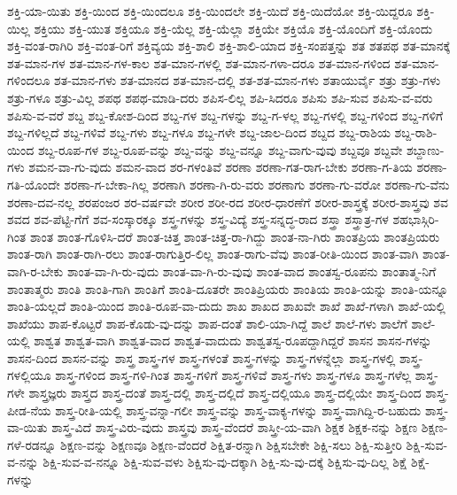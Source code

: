 {ಶಕ್ತಿ-ಯಾ-ಯಿತು
ಶಕ್ತಿ-ಯಿಂದ
ಶಕ್ತಿ-ಯಿಂದಲೂ
ಶಕ್ತಿ-ಯಿಂದಲೇ
ಶಕ್ತಿ-ಯಿದೆ
ಶಕ್ತಿ-ಯಿದೆಯೋ
ಶಕ್ತಿ-ಯಿದ್ದರೂ
ಶಕ್ತಿ-ಯಿಲ್ಲ
ಶಕ್ತಿಯು
ಶಕ್ತಿ-ಯುತ
ಶಕ್ತಿಯೂ
ಶಕ್ತಿ-ಯೆಲ್ಲ
ಶಕ್ತಿ-ಯೆಲ್ಲಾ
ಶಕ್ತಿಯೇ
ಶಕ್ತಿಯೊ
ಶಕ್ತಿ-ಯೊಂದಿಗೆ
ಶಕ್ತಿ-ಯೊಂದು
ಶಕ್ತಿ-ವಂತ-ರಾಗಿರಿ
ಶಕ್ತಿ-ವಂತ-ರಿಗೆ
ಶಕ್ತಿವ್ಯಯ
ಶಕ್ತಿ-ಶಾಲಿ
ಶಕ್ತಿ-ಶಾಲಿ-ಯಾದ
ಶಕ್ತಿ-ಸಂಪತ್ತನ್ನು
ಶತ
ಶತಪಥ
ಶತ-ಮಾನಕ್ಕೆ
ಶತ-ಮಾನ-ಗಳ
ಶತ-ಮಾನ-ಗಳ-ಕಾಲ
ಶತ-ಮಾನ-ಗಳಲ್ಲಿ
ಶತ-ಮಾನ-ಗಳಾ-ದರೂ
ಶತ-ಮಾನ-ಗಳಿಂದ
ಶತ-ಮಾನ-ಗಳಿಂದಲೂ
ಶತ-ಮಾನ-ಗಳು
ಶತ-ಮಾನದ
ಶತ-ಮಾನ-ದಲ್ಲಿ
ಶತ-ಶತ-ಮಾನ-ಗಳು
ಶತಾಯುರ್ವೈ
ಶತ್ರು
ಶತ್ರು-ಗಳು
ಶತ್ರು-ಗಳೂ
ಶತ್ರು-ವಿಲ್ಲ
ಶಪಥ
ಶಪಥ-ಮಾಡಿ-ದರು
ಶಪಿಸ-ಲಿಲ್ಲ
ಶಪಿ-ಸಿದರೂ
ಶಪಿಸು
ಶಪಿ-ಸುವ
ಶಪಿಸು-ವ-ವರು
ಶಪಿಸು-ವ-ವರೆ
ಶಬ್ದ
ಶಬ್ದ-ಕೋಶ-ದಿಂದ
ಶಬ್ದ-ಗಳ
ಶಬ್ದ-ಗಳನ್ನು
ಶಬ್ದ-ಗ-ಳಲ್ಲ
ಶಬ್ದ-ಗಳಲ್ಲಿ
ಶಬ್ದ-ಗಳಿಂದ
ಶಬ್ದ-ಗಳಿಗೆ
ಶಬ್ದ-ಗಳಿಲ್ಲದೆ
ಶಬ್ದ-ಗಳಿವೆ
ಶಬ್ದ-ಗಳು
ಶಬ್ದ-ಗಳೂ
ಶಬ್ದ-ಗಳೇ
ಶಬ್ದ-ಜಾಲ-ದಿಂದ
ಶಬ್ದದ
ಶಬ್ದ-ರಾಶಿಯ
ಶಬ್ದ-ರಾಶಿ-ಯಿಂದ
ಶಬ್ದ-ರೂಪ-ಗಳ
ಶಬ್ದ-ರೂಪ-ವನ್ನು
ಶಬ್ದ-ವನ್ನು
ಶಬ್ದ-ವನ್ನೂ
ಶಬ್ದ-ವಾಗು-ವುವು
ಶಬ್ದವೂ
ಶಬ್ದವೇ
ಶಬ್ದಾಣು-ಗಳು
ಶಮನ-ವಾ-ಗು-ವುದು
ಶಮನ-ವಾದ
ಶರ-ಗಳಂತಿವೆ
ಶರಣಾ
ಶರಣಾ-ಗತ-ರಾಗ-ಬೇಕು
ಶರಣಾ-ಗ-ತಿಯ
ಶರಣಾ-ಗತಿ-ಯೊಂದೇ
ಶರಣಾ-ಗ-ಬೇಕಾ-ಗಿಲ್ಲ
ಶರಣಾಗಿ
ಶರಣಾ-ಗಿ-ರು-ವರು
ಶರಣಾಗು
ಶರಣಾ-ಗು-ವರೋ
ಶರಣಾ-ಗು-ವೆನು
ಶರಣಾ-ದವ-ನಲ್ಲ
ಶರಪಂಜರ
ಶರ-ವರ್ಷವೇ
ಶರೀರ
ಶರೀ-ರದ
ಶರೀರ-ಧಾರಣೆಗೆ
ಶರೀರ-ಶಾಸ್ತ್ರಕ್ಕೆ
ಶರೀರ-ಶಾಸ್ತ್ರವು
ಶವ
ಶವದ
ಶವ-ಪೆಟ್ಟಿ-ಗೆಗೆ
ಶವ-ಸಂಸ್ಕಾರಕ್ಕೂ
ಶಸ್ತ್ರ-ಗಳನ್ನು
ಶಸ್ತ್ರ-ವಿದ್ಯೆ
ಶಸ್ತ್ರ-ಸನ್ನದ್ಧ-ರಾದ
ಶಸ್ತ್ರಾ
ಶಸ್ತ್ರಾತ್ರ-ಗಳ
ಶಹಭಾಸ್ಗಿರಿ-ಗಿಂತ
ಶಾಂತ
ಶಾಂತ-ಗೊಳಿಸಿ-ದರೆ
ಶಾಂತ-ಚಿತ್ತ
ಶಾಂತ-ಚಿತ್ತ-ರಾ-ಗಿದ್ದು
ಶಾಂತ-ನಾ-ಗಿರು
ಶಾಂತಪ್ರಿಯ
ಶಾಂತಪ್ರಿಯರು
ಶಾಂತ-ರಾಗಿ
ಶಾಂತ-ರಾಗಿ-ರಲು
ಶಾಂತ-ರಾಗುತ್ತಿರ-ಲಿಲ್ಲ
ಶಾಂತ-ರಾಗು-ವೆವು
ಶಾಂತ-ರೀತಿ-ಯಿಂದ
ಶಾಂತ-ವಾಗಿ
ಶಾಂತ-ವಾಗಿ-ರ-ಬೇಕು
ಶಾಂತ-ವಾ-ಗಿ-ರು-ವುದು
ಶಾಂತ-ವಾ-ಗಿ-ರು-ವುವು
ಶಾಂತ-ವಾದ
ಶಾಂತಸ್ವ-ರೂಪನು
ಶಾಂತಾತ್ಮ-ನಿಗೆ
ಶಾಂತಾತ್ಮರು
ಶಾಂತಿ
ಶಾಂತಿ-ಗಾಗಿ
ಶಾಂತಿಗೆ
ಶಾಂತಿ-ದೂತರೇ
ಶಾಂತಿಪ್ರಿಯರು
ಶಾಂತಿಯ
ಶಾಂತಿ-ಯನ್ನು
ಶಾಂತಿ-ಯನ್ನೂ
ಶಾಂತಿ-ಯಲ್ಲದೆ
ಶಾಂತಿ-ಯಿಂದ
ಶಾಂತಿ-ರೂಪ-ವಾ-ದುದು
ಶಾಖ
ಶಾಖದ
ಶಾಖವೇ
ಶಾಖೆ
ಶಾಖೆ-ಗಳಾಗಿ
ಶಾಖೆ-ಯಲ್ಲಿ
ಶಾಖೆಯು
ಶಾಪ-ಕೊಟ್ಟರೆ
ಶಾಪ-ಕೊಡು-ವು-ದನ್ನು
ಶಾಪ-ದಂತೆ
ಶಾಲಿ-ಯಾ-ಗಿದ್ದೆ
ಶಾಲೆ
ಶಾಲೆ-ಗಳು
ಶಾಲೆಗೆ
ಶಾಲೆ-ಯಲ್ಲಿ
ಶಾಶ್ವತ
ಶಾಶ್ವತ-ವಾಗಿ
ಶಾಶ್ವತ-ವಾದ
ಶಾಶ್ವತ-ವಾದುದು
ಶಾಶ್ವತಸ್ವ-ರೂಪದ್ದಾಗಿದ್ದರೆ
ಶಾಸನ
ಶಾಸನ-ಗಳನ್ನು
ಶಾಸನ-ದಿಂದ
ಶಾಸನ-ವನ್ನು
ಶಾಸ್ತ್ರ
ಶಾಸ್ತ್ರ-ಗಳ
ಶಾಸ್ತ್ರ-ಗಳಂತೆ
ಶಾಸ್ತ್ರ-ಗಳನ್ನು
ಶಾಸ್ತ್ರ-ಗಳನ್ನೆಲ್ಲಾ
ಶಾಸ್ತ್ರ-ಗಳಲ್ಲಿ
ಶಾಸ್ತ್ರ-ಗಳಲ್ಲಿಯೂ
ಶಾಸ್ತ್ರ-ಗಳಿಂದ
ಶಾಸ್ತ್ರ-ಗಳಿ-ಗಿಂತ
ಶಾಸ್ತ್ರ-ಗಳಿಗೆ
ಶಾಸ್ತ್ರ-ಗಳಿವೆ
ಶಾಸ್ತ್ರ-ಗಳು
ಶಾಸ್ತ್ರ-ಗಳೂ
ಶಾಸ್ತ್ರ-ಗಳೆಲ್ಲ
ಶಾಸ್ತ್ರ-ಗಳೇ
ಶಾಸ್ತ್ರಜ್ಞರು
ಶಾಸ್ತ್ರದ
ಶಾಸ್ತ್ರ-ದಂತೆ
ಶಾಸ್ತ್ರ-ದಲ್ಲಿ
ಶಾಸ್ತ್ರ-ದಲ್ಲಿದೆ
ಶಾಸ್ತ್ರ-ದಲ್ಲಿಯೂ
ಶಾಸ್ತ್ರ-ದಲ್ಲಿಯೇ
ಶಾಸ್ತ್ರ-ದಿಂದ
ಶಾಸ್ತ್ರ-ಪೀಡ-ನೆಯ
ಶಾಸ್ತ್ರ-ರೀತಿ-ಯಲ್ಲಿ
ಶಾಸ್ತ್ರ-ವನ್ನಾ-ಗಲೀ
ಶಾಸ್ತ್ರ-ವನ್ನು
ಶಾಸ್ತ್ರ-ವಾಕ್ಯ-ಗಳನ್ನು
ಶಾಸ್ತ್ರ-ವಾಗಿದ್ದಿ-ರ-ಬಹುದು
ಶಾಸ್ತ್ರ-ವಾ-ಯಿತು
ಶಾಸ್ತ್ರ-ವಿದೆ
ಶಾಸ್ತ್ರ-ವಿರು-ವುದು
ಶಾಸ್ತ್ರವು
ಶಾಸ್ತ್ರ-ವೆಂದರೆ
ಶಾಸ್ತ್ರೀ-ಯ-ವಾಗಿ
ಶಿಕ್ಷಕ
ಶಿಕ್ಷಕ-ನನ್ನು
ಶಿಕ್ಷಣ
ಶಿಕ್ಷಣ-ಗಳೆ-ರಡನ್ನೂ
ಶಿಕ್ಷಣ-ವನ್ನು
ಶಿಕ್ಷಣವೂ
ಶಿಕ್ಷಣ-ವೆಂದರೆ
ಶಿಕ್ಷಿತ-ರನ್ನಾಗಿ
ಶಿಕ್ಷಿಸಬೇಕೇ
ಶಿಕ್ಷಿ-ಸಲು
ಶಿಕ್ಷಿ-ಸುತ್ತೀರಿ
ಶಿಕ್ಷಿ-ಸುವ-ವ-ನನ್ನು
ಶಿಕ್ಷಿ-ಸುವ-ವ-ನನ್ನೂ
ಶಿಕ್ಷಿ-ಸುವ-ವಳು
ಶಿಕ್ಷಿಸು-ವು-ದಕ್ಕಾಗಿ
ಶಿಕ್ಷಿ-ಸು-ವು-ದಕ್ಕೆ
ಶಿಕ್ಷಿಸು-ವು-ದಿಲ್ಲ
ಶಿಕ್ಷೆ
ಶಿಕ್ಷೆ-ಗಳನ್ನು
}

